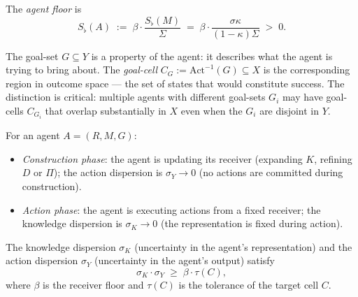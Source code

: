 \documentclass[twocolumn,11pt,a4paper]{article}
\newcommand{\Sfloor}{S_{\flat}}
\newcommand{\Action}{\mathrm{Act}}
\begin{document}
\begin{definition}
\label{def:agentfloor}
The \emph{agent floor} is
\[
  \Sfloor(A)\;:=\;\beta\cdot\frac{\Sfloor(M)}{\Sigma}
  \;=\;\beta\cdot\frac{\sigma\kappa}{(1-\kappa)\Sigma}\;>\;0.
\]
\end{definition}

\begin{remark}
\label{rem:goalvscell}
The goal-set $G\subseteq Y$ is a property of the agent: it describes what
the agent is trying to bring about.  The \emph{goal-cell}
$C_G:=\Action^{-1}(G)\subseteq X$ is the corresponding region in outcome
space — the set of states that would constitute success.  The distinction
is critical: multiple agents with different goal-sets $G_i$ may have
goal-cells $C_{G_i}$ that overlap substantially in $X$ even when the
$G_i$ are disjoint in $Y$.
\end{remark}

\begin{definition}
\label{def:phases}
For an agent $A=(R,M,G)$:
\begin{itemize}[leftmargin=*]
  \item \emph{Construction phase}: the agent is updating its receiver
    (expanding $K$, refining $D$ or $\Pi$); the action dispersion is
    $\sigma_Y\to 0$ (no actions are committed during construction).
  \item \emph{Action phase}: the agent is executing actions from a fixed
    receiver; the knowledge dispersion is $\sigma_K\to 0$ (the
    representation is fixed during action).
\end{itemize}
\end{definition}

\begin{theorem}
\label{thm:uncertaintyprinciple}
The knowledge dispersion $\sigma_K$ (uncertainty in the agent's
representation) and the action dispersion $\sigma_Y$ (uncertainty in the
agent's output) satisfy
\[
  \sigma_K\cdot\sigma_Y\;\geq\;\beta\cdot\tau(C),
\]
where $\beta$ is the receiver floor and $\tau(C)$ is the tolerance of
the target cell $C$.
\end{theorem}
\end{document}
